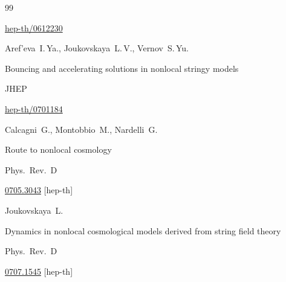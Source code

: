 \begin{thebibliography}{99}



\arxiv \href{http://arxiv.org/abs/hep-th/0612230}{hep-th/0612230}





\by Aref'eva~I.\,Ya., Joukovskaya~L.\,V., Vernov~S.\,Yu.


\paper Bouncing and accelerating solutions in nonlocal stringy models

\jour JHEP




\arxiv \href{http://arxiv.org/abs/hep-th/0701184}{hep-th/0701184}





\by  Calcagni~G., Montobbio~M., Nardelli~G.

\paper Route to nonlocal cosmology

\jour Phys.~Rev.~D 





\arxiv \href{http://arxiv.org/abs/0705.3043}{0705.3043} [hep-th]





\by   Joukovskaya~L.

\paper Dynamics in nonlocal cosmological models derived from string field theory

\jour Phys.~Rev.~D 





\arxiv \href{http://arxiv.org/abs/0707.1545}{0707.1545} [hep-th]








\end{thebibliography}
